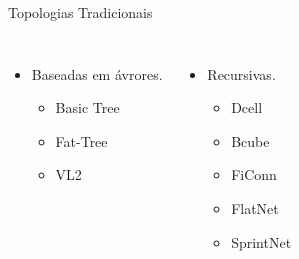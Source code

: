 \documentclass[aspectratio=169]{beamer}
\begin{document}
        \begin{frame} {Topologias Tradicionais}
           \begin{columns}    
             \begin{itemize}
              
             \setlength\itemsep{2em}
                \Large
                \item
                    Baseadas em ávrores.
                    
              
                \begin{itemize}
                    
                    \item
                        Basic Tree
                
                    \item
                        Fat-Tree
                
                     \item
                        VL2 
                                
                \end{itemize}
                        
             \end{itemize}
                
              \begin{itemize}
               
              \setlength\itemsep{2em}
                 \Large
                 \item
                     Recursivas.
                     
               
                 \begin{itemize}
                    
                     \item
                         Dcell
                 
                     \item
                         Bcube
                 
                      \item
                         FiConn
                                 
                       \item
                        FlatNet
                       
                       \item
                        SprintNet
                 \end{itemize}
                         
              \end{itemize}
          \end{columns} 
         \end{frame}
    
\end{document}
